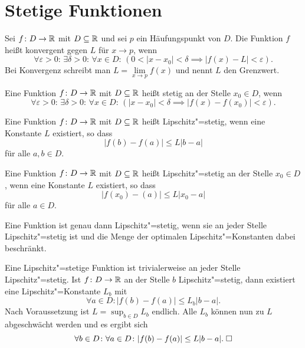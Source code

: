 \newpage
\section{Stetige Funktionen}

\begin{Definition}\label{fn-lim}
Sei $f\colon D\to\mathbb R$ mit $D\subseteq\mathbb R$ und sei $p$ ein
Häufungspunkt von $D$. Die Funktion $f$ heißt konvergent
gegen $L$ für $x\to p$, wenn%
\[\forall \varepsilon{>}0\colon\,\exists \delta{>}0\colon\,\forall x{\in}D\colon\,
(0<|x-x_0|<\delta\implies |f(x)-L|<\varepsilon).\]
Bei Konvergenz schreibt man $L=\lim\limits_{x\to p} f(x)$ und nennt $L$ den Grenzwert.
\end{Definition}

\begin{Definition}%
\label{cont}\newlinefirst
Eine Funktion $f\colon D\to\mathbb R$ mit $D\subseteq\mathbb R$ heißt stetig an der
Stelle $x_0\in D$, wenn
\[\forall \varepsilon{>}0\colon\,\exists \delta{>}0\colon\,\forall x{\in}D\colon\,
(|x-x_0|<\delta\implies |f(x)-f(x_0)|<\varepsilon).\]
\end{Definition}

\begin{Definition}%
\newlinefirst
Eine Funktion $f\colon D\to\mathbb R$ mit $D\subseteq\mathbb R$ heißt
Lipschitz"=stetig, wenn eine Konstante $L$ existiert, so dass
\[|f(b)-f(a)|\le L|b-a|\]
für alle $a,b\in D$.
\end{Definition}

\begin{Definition}%
\label{Lipschitz-cont-at}\newlinefirst
Eine Funktion $f\colon D\to\mathbb R$ mit $D\subseteq\mathbb R$ heißt
Lipschitz"=stetig an der Stelle $x_0\in D$, wenn eine Konstante $L$
existiert, so dass
\[|f(x_0)-(a)|\le L|x_0-a|\]
für alle $a\in D$.
\end{Definition}

\begin{Satz}
Eine Funktion ist genau dann Lipschitz"=stetig, wenn sie an jeder
Stelle Lipschitz"=stetig ist und die Menge der optimalen
Lipschitz"=Konstanten dabei beschränkt.
\end{Satz}
\begin{Beweis}
Eine Lipschitz"=stetige Funktion ist trivialerweise an jeder Stelle
Lipschitz"=stetig. Ist $f\colon D\to\mathbb R$ an der Stelle $b$ Lipschitz"=stetig,
dann existiert eine Lipschitz"=Konstante $L_b$ mit%
\[\forall a\in D\colon |f(b)-f(a)|\le L_b |b-a|.\]
Nach Voraussetzung ist $L=\sup_{b\in D} L_b$ endlich. Alle $L_b$ können
nun zu $L$ abgeschwächt werden und es ergibt sich%
\[\forall b\in D\colon\forall a\in D\colon |f(b)-f(a)|\le L|b-a|.\;\square\]
\end{Beweis}


